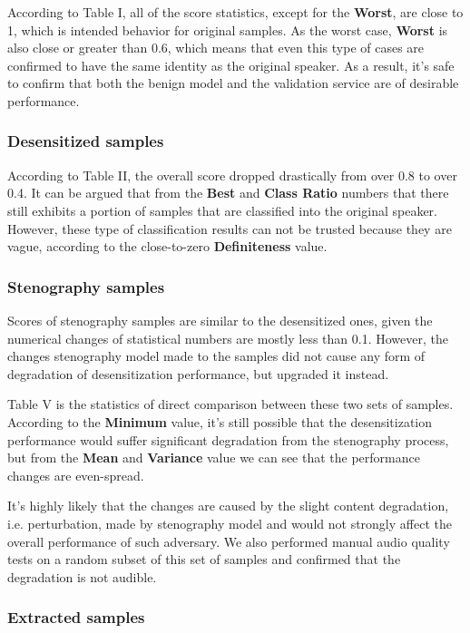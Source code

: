 \documentclass[journal]{IEEEtran} %
\begin{document}
According to Table I, all of the score statistics, except for the \textbf{Worst}, are close to 1, which is intended behavior for original samples. As the worst case, \textbf{Worst} is also close or greater than 0.6, which means that even this type of cases are confirmed to have the same identity as the original speaker. As a result, it's safe to confirm that both the benign model and the validation service are of desirable performance.

\subsubsection{Desensitized samples}

According to Table II, the overall score dropped drastically from over 0.8 to over 0.4. It can be argued that from the \textbf{Best} and \textbf{Class Ratio} numbers that there still exhibits a portion of samples that are classified into the original speaker. However, these type of classification results can not be trusted because they are vague, according to the close-to-zero \textbf{Definiteness} value.

\subsubsection{Stenography samples}

Scores of stenography samples are similar to the desensitized ones, given the numerical changes of statistical numbers are mostly less than 0.1. However, the changes stenography model made to the samples did not cause any form of degradation of desensitization performance, but upgraded it instead.

Table V is the statistics of direct comparison between these two sets of samples. According to the \textbf{Minimum} value, it's still possible that the desensitization performance would suffer significant degradation from the stenography process, but from the \textbf{Mean} and \textbf{Variance} value we can see that the performance changes are even-spread.

It's highly likely that the changes are caused by the slight content degradation, i.e. perturbation, made by stenography model and would not strongly affect the overall performance of such adversary. We also performed manual audio quality tests on a random subset of this set of samples and confirmed that the degradation is not audible.

\subsubsection{Extracted samples}
\end{document}

